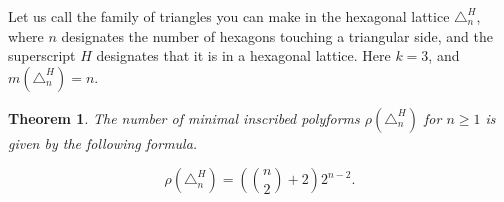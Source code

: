 \documentclass[12pt]{article}
\newtheorem{theorem}{Theorem}
\theoremstyle{plain}
\theoremstyle{definition}
\theoremstyle{remark}
\theoremstyle{definition}
\begin{document}
\begin{center}
\begin{minipage}{0.25\textwidth}
    \end{minipage}
\end{center}

Let us call the family of triangles you can make in the hexagonal lattice $\triangle^H_n$, where $n$ designates the number of hexagons touching a triangular side, and the superscript $H$ designates that it is in a hexagonal lattice. Here $k=3$, and $m(\triangle^H_n) = n$.

\begin{theorem}\label{thm: tri in hex}
The number of minimal inscribed polyforms $\rho(\triangle^H_n)$ for $n\geq 1$ is given by the following formula.

\begin{equation}
    \rho(\triangle^H_n) = \left( \binom{n}{2}+2 \right) 2^{n-2}.
\end{equation}
\end{theorem}
\end{document}
